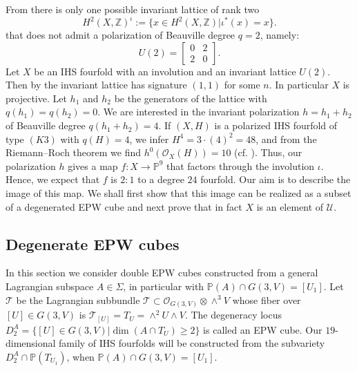 \documentclass[a4paper,11pt]{amsart}
\theoremstyle{definition}
\numberwithin{equation}{section}
\numberwithin{equation}{section} \theoremstyle{definition}
\begin{document}
From \cite{OW} there is only one possible invariant lattice of rank two
$$H^2(X,\mathbb{Z})^{\iota}:=\{ x\in H^2(X,\mathbb{Z})| \iota^{\ast}(x)=x \}.$$
 that does not admit a polarization of Beauville degree $q=2$, namely:
$$U(2)=\begin{bmatrix} 0&2\\
2&0
\end{bmatrix}.$$
Let $X$ be an IHS fourfold with an involution and an invariant lattice $U(2)$.
 Then by \cite{beau-invo} the invariant lattice
has signature $(1,1)$ for some $n$. In particular $X$ is projective.
Let $h_1$ and $h_2$ be the generators of the lattice with $q(h_1)=q(h_2)=0$.
We are interested in the invariant polarization $h=h_1+h_2$ of Beauville degree $q(h_1+h_2)=4$.
If $(X,H)$ is a polarized IHS fourfold of type $(K3)$ with $q(H)=4$, we infer
$H^4=3\cdot (4)^2=48$, and from the Riemann--Roch theorem we find $h^0(\mathcal{O}_X(H))=10$ (cf. \cite[Theorem~5.2]{Nieper}).
Thus, our polarization $h$ gives a map $f\colon X\to {{\mathbb{P}}}^9$ that factors through the involution $\iota$.
Hence, we expect that $f$ is $2:1$ to a degree $24$ fourfold. Our aim is to describe the image of this map.
We shall first show that this image can be realized as a subset of a degenerated EPW cube and next prove that in fact $X$ is an element of $\mathcal{U}$. 

\subsection{Degenerate EPW cubes}\label{Section-Singular}
In this section we consider double EPW cubes constructed from a general Lagrangian subspace $A\in \Sigma$, in particular with  ${{\mathbb{P}}}(A)\cap G(3,V)=[U_1]$.
Let $\mathcal{T}$ be the Lagrangian subbundle $\mathcal{T}\subset \mathcal{O}_{G(3,V)}\otimes \wedge^3 V$ whose fiber over $[U]\in G(3,V)$  is $\mathcal{T}_{[U]}=T_U=\wedge^2 U\wedge V$.   The degeneracy locus $D_2^A=\{[U]\in G(3,V)| \dim (A\cap T_U)\geq 2\}$ is called an EPW cube.   
Our $19$-dimensional family of IHS fourfolds will be constructed from the subvariety $D_2^A\cap {{\mathbb{P}}}(T_{U_1})$, when ${{\mathbb{P}}}(A)\cap G(3,V)=[U_1]$.  
\end{document}
